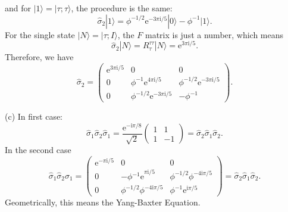 and for $|1 \rangle =|\tau ;\tau \rangle $, the procedure is the same:
\begin{equation*}
\hat{\sigma }_{2} |1\rangle =\phi ^{-1/2}\mathrm{e}^{-3\pi \mathrm{i} /5} |0 \rangle -\phi ^{-1} |1 \rangle .
\end{equation*}
For the single state $|N \rangle =|\tau ;I \rangle $, the $F$ matrix is just a number, which means
\begin{equation*}
\hat{\sigma }_{2} |N\rangle =R_{\tau }^{\tau \tau } |N\rangle =\mathrm{e}^{3\pi \mathrm{i} /5} .
\end{equation*}
Therefore, we have
\begin{equation*}
\hat{\sigma }_{2} =\begin{pmatrix}
\mathrm{e}^{3\pi \mathrm{i} /5} & 0 & 0\\
0 & \phi ^{-1}\mathrm{e}^{4\pi \mathrm{i} /5} & \phi ^{-1/2}\mathrm{e}^{-3\pi \mathrm{i} /5}\\
0 & \phi ^{-1/2}\mathrm{e}^{-3\pi \mathrm{i} /5} & -\phi ^{-1}
\end{pmatrix} .
\end{equation*}


(c) In first case:
\begin{equation*}
\hat{\sigma }_{1}\hat{\sigma }_{2}\hat{\sigma }_{1} =\frac{\mathrm{e}^{-\mathrm{i} \pi /8}}{\sqrt{2}}\begin{pmatrix}
1 & 1\\
1 & -1
\end{pmatrix} =\hat{\sigma }_{2}\hat{\sigma }_{1}\hat{\sigma }_{2} .
\end{equation*}
In the second case
\begin{equation*}
\hat{\sigma }_{1}\hat{\sigma }_{2}\hat{\sigma }_{1} =\begin{pmatrix}
\mathrm{e}^{-\pi \mathrm{i} /5} & 0 & 0\\
0 & -\phi \mathrm{^{-1} e}^{\pi \mathrm{i} /5} & \phi ^{-1/2} \phi ^{-4\mathrm{i} \pi /5}\\
0 & \phi ^{-1/2} \phi ^{-4\mathrm{i} \pi /5} & \phi ^{-1}\mathrm{e}^{\mathrm{i} \pi /5}
\end{pmatrix} =\hat{\sigma }_{2}\hat{\sigma }_{1}\hat{\sigma }_{2} .
\end{equation*}
Geometrically, this means the Yang-Baxter Equation.

